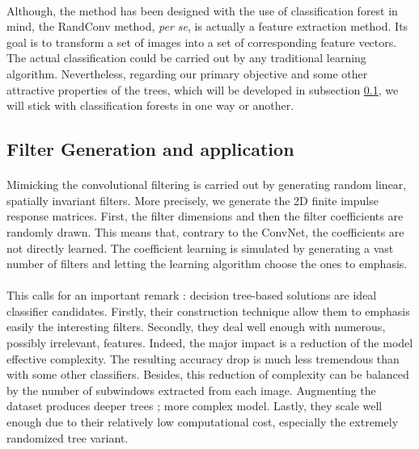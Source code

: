 \documentclass[a4paper]{report}
\begin{document}
	
	
	\paragraph{}
	Although, the method has been designed with the use of classification forest in mind, the RandConv method, \textit{per se}, is actually a feature extraction method. Its goal is to transform a set of images into a set of corresponding feature vectors. The actual classification could be carried out by any traditional learning algorithm. Nevertheless, regarding our primary objective and some other attractive properties of the trees, which will be developed in subsection \ref{subsec:methodo-filtergen}, we will stick with classification forests in one way or another.


	
		\subsection{Filter Generation and application}\label{subsec:methodo-filtergen}
		\paragraph{}
		Mimicking the convolutional filtering is carried out by generating random linear, spatially invariant filters. More precisely, we generate the 2D finite impulse response matrices. First, the filter dimensions and then the filter coefficients are randomly drawn. This means that, contrary to the ConvNet, the coefficients are not directly learned. The coefficient learning is simulated by generating a vast number of filters and letting the learning algorithm choose the ones to emphasis. 
		\paragraph{}
		This calls for an important remark : decision tree-based solutions are ideal classifier candidates. Firstly, their construction technique allow them to emphasis easily the interesting filters. Secondly, they deal well enough with numerous, possibly irrelevant, features. Indeed, the major impact is a reduction of the model effective complexity. The resulting accuracy drop is much less tremendous than with some other classifiers. Besides, this reduction of complexity can be balanced by the number of subwindows extracted from each image. Augmenting the dataset produces deeper trees ; more complex model. Lastly, they scale well enough due to their relatively low computational cost, especially the extremely randomized tree variant.
		
\end{document}

